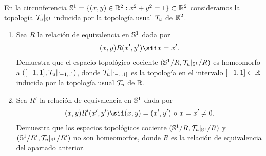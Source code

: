 \documentclass[12pt]{article}
\begin{document}
    \begin{ejercicio}[4 puntos]
        En la circunferencia $\mathbb{S}^1=\{(x,y)\in \mathbb{R}^2 : x^2 + y^2 = 1\}\subset \mathbb{R}^2$ consideramos la topología $\mathcal{T}_u|_{\mathbb{S}^1}$ inducida por la topología usual $\mathcal{T}_u$ de $\mathbb{R}^2$.
        \begin{enumerate}
            \item Sea $R$ la relación de equivalencia en $\mathbb{S}^1$ dada por 
            \begin{align*}
                (x,y)R(x',y') \sii x=x'.
            \end{align*}
            Demuestra que el espacio topológico cociente $(\mathbb{S}^1/R, \mathcal{T}_u|_{\mathbb{S}^1}/R)$ es homeomorfo a $([-1,1], \mathcal{T}_u|_{[-1,1]})$, donde $\mathcal{T}_u|_{[-1.1]}$ es la topología en el intervalo $[-1,1]\subset \mathbb{R}$ inducida por la topología usual $\mathcal{T}_u$ de $\mathbb{R}$.

            \item Sea $R'$ la relación de equivalencia en $\mathbb{S}^1$ dada por
            \begin{align*}
                (x,y)R'(x',y')\sii (x,y)=(x',y') \text{ o } x=x'\neq 0.
            \end{align*}
            Demuestra que los espacios topológicos cociente $(\mathbb{S}^1/R, \mathcal{T}_u|_{\mathbb{S}^1}/R)$ y $(\mathbb{S}^1/R', \mathcal{T}_u|_{\mathbb{S}^1}/R')$ no son homeomorfos, donde $R$ es la relación de equivalencia del apartado anterior.
        \end{enumerate}
    \end{ejercicio}
\end{document}

